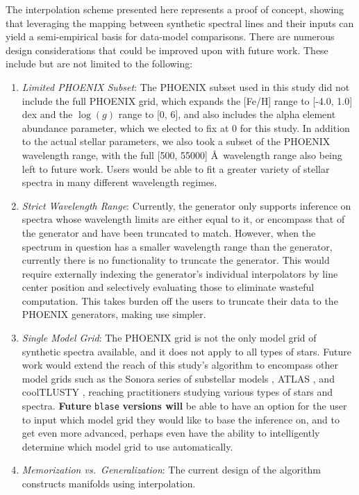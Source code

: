 \documentclass[twocolumn, linenumbers]{aastex631}
\begin{document}
The interpolation scheme presented here represents a proof of concept, showing that leveraging the mapping between synthetic spectral lines and their inputs can yield a semi-empirical basis for data-model comparisons.
There are numerous design considerations that could be improved upon with future work.
These include but are not limited to the following:
\begin{enumerate}[label=-]
    \item \textit{Limited PHOENIX Subset}: The PHOENIX subset used in this study did not include the full PHOENIX grid, which expands the [Fe/H] range to [-4.0, 1.0] dex and the $\log(g)$ range to [0, 6], and also includes the alpha element abundance parameter, which we elected to fix at 0 for this study.
    In addition to the actual stellar parameters, we also took a subset of the PHOENIX wavelength range, with the full [500, 55000] \AA \ wavelength range also being left to future work.
    Users would be able to fit a greater variety of stellar spectra in many different wavelength regimes.
    \item \textit{Strict Wavelength Range}: Currently, the generator only supports inference on spectra whose wavelength limits are either equal to it, or encompass that of the generator and have been truncated to match.
    However, when the spectrum in question has a smaller wavelength range than the generator, currently there is no functionality to truncate the generator.
    This would require externally indexing the generator's individual interpolators by line center position and selectively evaluating those to eliminate wasteful computation.
    This takes burden off the users to truncate their data to the PHOENIX generators, making use simpler.
    \item \textit{Single Model Grid}: The PHOENIX grid is not the only model grid of synthetic spectra available, and it does not apply to all types of stars.
    Future work would extend the reach of this study's algorithm to encompass other model grids such as the Sonora series of substellar models \textbf{\citep{bobcat, cholla, diamondback, elfowl}}, ATLAS \citep{atlas}, and coolTLUSTY \citep{coolTLUSTY}, reaching practitioners studying various types of stars and spectra.
    \textbf{Future} \texttt{blase} \textbf{versions will} be able to have an option for the user to input which model grid they would like to base the inference on, and to get even more advanced, perhaps even have the ability to intelligently determine which model grid to use automatically.
    \item \textit{Memorization vs.\ Generalization}: The current design of the algorithm constructs manifolds using interpolation.

\end{enumerate}
\end{document}
